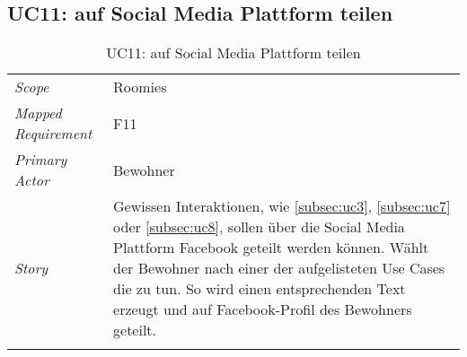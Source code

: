 \subsection{UC11: auf Social Media Plattform teilen}\label{subsec:uc11}
\begin{table}[H]
	\tablestyle
	\tablealtcolored
	\begin{tabularx}{\textwidth}{lX}
		\tablebody
			\textit{Scope} &
			Roomies
			\tabularnewline
			\textit{Mapped Requirement} &
			F11
			\tabularnewline
			\textit{Primary Actor} &
			Bewohner
			\tabularnewline
			\textit{Story} &
			Gewissen Interaktionen, wie \ref{subsec:uc3}, \ref{subsec:uc7} oder \ref{subsec:uc8}, sollen über die Social Media Plattform Facebook geteilt werden können. Wählt der Bewohner nach einer der aufgelisteten Use Cases die zu tun. So wird einen entsprechenden Text erzeugt und auf Facebook-Profil des Bewohners geteilt.
			\tabularnewline
		\tableend
	\end{tabularx}
	\caption{UC11: auf Social Media Plattform teilen}
\end{table}
